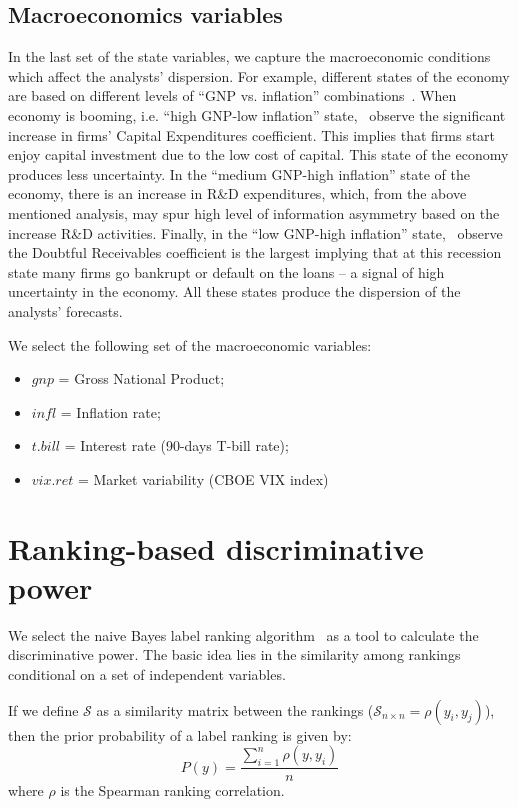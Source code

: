 \documentclass[a4paper,12pt,openright,notitlepage]{report}\usepackage[]{graphicx}\usepackage[]{color}
\begin{document}
\subsection{Macroeconomics variables}
In the last set of the state variables, we  capture the macroeconomic conditions which affect the analysts' dispersion. For example, different states of the economy are based on  different levels of ``GNP vs. inflation'' combinations~\citep{lev1993,hope2005}. When economy is booming, i.e. ``high GNP-low inflation'' state,~\cite{lev1993} observe the significant increase in firms' Capital Expenditures coefficient. This implies that firms start enjoy capital investment due to the low cost of capital. This state of the economy produces less uncertainty. In the ``medium GNP-high inflation'' state of the economy, there is an increase in R\&D expenditures, which, from the above mentioned analysis, may spur high level of information asymmetry based on the increase R\&D activities. Finally, in the ``low GNP-high inflation'' state,~\cite{lev1993} observe the Doubtful Receivables coefficient is the largest implying that at this recession state many firms go bankrupt or default on the loans -- a signal of high uncertainty in the economy. All these states produce the dispersion of the analysts' forecasts.

We select the following set of the macroeconomic variables:
\begin{itemize}
\item $gnp$ = Gross National Product;
\item $infl$ = Inflation rate;
\item $t.bill$ = Interest rate (90-days T-bill rate);
\item $vix.ret$ = Market variability (CBOE VIX index)
\end{itemize}


\section{Ranking-based discriminative power}
\label{ch3-sec:labelranking}


We select the naive Bayes label ranking algorithm~\citep{aiguzhinov2010} as a tool to calculate the discriminative power. The basic idea lies in the similarity  among rankings conditional on a set of independent variables.

If we  define $\mathcal{S}$ as a similarity matrix between the rankings ($\mathcal{S}_{n \times n}=\rho(y_i,y_j)$), then the prior probability of a label ranking is given by:
\begin{equation}
P(y) = \frac{\sum_{i=1}^{n} \rho(y,y_i)}{n}
\end{equation}
where $\rho$ is the Spearman ranking correlation.
\end{document}
